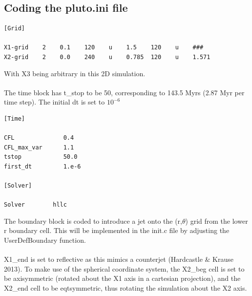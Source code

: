 \documentclass[12pt,a4paper]{report}
\begin{document}
\subsection{Coding the pluto.ini file}
\begin{lstlisting}
[Grid]

X1-grid    2    0.1    120    u    1.5    120    u    ###
X2-grid    2    0.0    240    u    0.785  120    u    1.571
\end{lstlisting}
With X3 being arbitrary in this 2D simulation.\\
\\
The time block has t\_stop to be 50, corresponding to 143.5 Myrs (2.87 Myr per time step). The initial dt is set to $10^{-6}$
\begin{lstlisting}
[Time]

CFL              0.4
CFL_max_var      1.1
tstop            50.0
first_dt         1.e-6

[Solver]

Solver        hllc

\end{lstlisting}

The boundary block is coded to introduce a jet onto the (r,$\theta$) grid from the lower r boundary cell. This will be implemented in the init.c file by adjusting the UserDefBoundary function.\\
\\
X1\_end is set to reflective as this mimics a counterjet (Hardcastle \& Krause 2013).
To make use of the spherical coordinate system, the X2\_beg cell is set to be axisymmetric (rotated about the X1 axis in a cartesian projection), and the X2\_end cell to be eqtsymmetric, thus rotating the simulation about the X2 axis.
\end{document}
